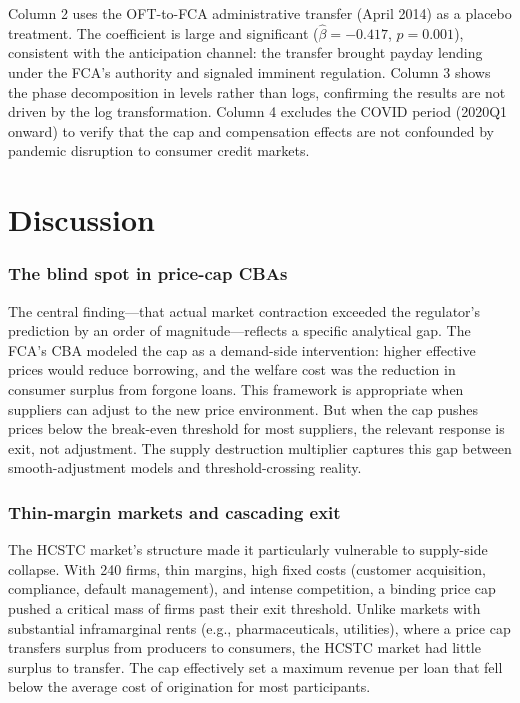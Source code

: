 \documentclass[12pt]{article}
\begin{document}
Column 2 uses the OFT-to-FCA administrative transfer (April 2014) as a placebo treatment. The coefficient is large and significant ($\hat{\beta} = -0.417$, $p = 0.001$), consistent with the anticipation channel: the transfer brought payday lending under the FCA's authority and signaled imminent regulation. Column 3 shows the phase decomposition in levels rather than logs, confirming the results are not driven by the log transformation. Column 4 excludes the COVID period (2020Q1 onward) to verify that the cap and compensation effects are not confounded by pandemic disruption to consumer credit markets.



\section{Discussion}

\subsubsection*{The blind spot in price-cap CBAs} The central finding---that actual market contraction exceeded the regulator's prediction by an order of magnitude---reflects a specific analytical gap. The FCA's CBA modeled the cap as a demand-side intervention: higher effective prices would reduce borrowing, and the welfare cost was the reduction in consumer surplus from forgone loans. This framework is appropriate when suppliers can adjust to the new price environment. But when the cap pushes prices below the break-even threshold for most suppliers, the relevant response is exit, not adjustment. The supply destruction multiplier captures this gap between smooth-adjustment models and threshold-crossing reality.

\subsubsection*{Thin-margin markets and cascading exit} The HCSTC market's structure made it particularly vulnerable to supply-side collapse. With 240 firms, thin margins, high fixed costs (customer acquisition, compliance, default management), and intense competition, a binding price cap pushed a critical mass of firms past their exit threshold. Unlike markets with substantial inframarginal rents (e.g., pharmaceuticals, utilities), where a price cap transfers surplus from producers to consumers, the HCSTC market had little surplus to transfer. The cap effectively set a maximum revenue per loan that fell below the average cost of origination for most participants.
\end{document}
